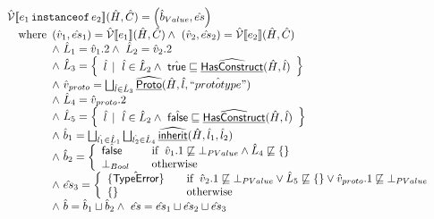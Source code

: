 \[
\begin{array}{ll}
\aV\lbr e_1\,\TT{instanceof}\,e_2\rbr (\hat{H},\hat{C})
 = \left(\hat{b}_{Value},\hat{es}\right)\\
\quad\wherec{
  (\hat{v}_1,\hat{es}_1) = \aV\lbr e_1\rbr(\hat{H},\hat{C})
  \land\ (\hat{v}_2,\hat{es}_2) = \aV\lbr e_2\rbr(\hat{H},\hat{C})\\
  \land\ \hat{L}_1 = \hat{v}_1.2
  \land\ \hat{L}_2 = \hat{v}_2.2\\
  \land\ \hat{L}_3 = \set{ \hat{l} \,\mid\ \hat{l}\in\hat{L}_2\land\ \atrue\sqsubseteq\ahf{HasConstruct}(\hat{H},\hat{l}) } \\
  \land\ \hat{v}_{proto} = \bigsqcup_{\hat{l}\in\hat{L}_3} \ahf{Proto}(\hat{H},\hat{l},\hat{``prototype"}) \\
  \land\ \hat{L}_4 = \hat{v}_{proto}.2 \\
  \land\ \hat{L}_5 = \set{ \hat{l} \,\mid\ \hat{l}\in\hat{L}_2\land\ \afalse\sqsubseteq\ahf{HasConstruct}(\hat{H},\hat{l}) } \\
  \land\ \hat{b}_1 = \bigsqcup_{\hat{l_1}\in\hat{L}_1}\bigsqcup_{\hat{l_2}\in\hat{L}_4}\ahf{inherit}(\hat{H},\hat{l}_1,\hat{l}_2) \\
  \land\ \hat{b}_2 = \left\{
    \begin{array}{ll}
      \afalse & \quad\ifc{\hat{v}_1.1\not\sqsubseteq \bot_{PValue} \land \hat{L}_4\not\sqsubseteq \{\}} \\
      \bot_{Bool} & \quad\owc \\
    \end{array}
  \right.\\
  \land\ \hat{es}_3 = \left\{
    \begin{array}{ll}
      \{\hat{\exc{TypeError}}\} & \quad\ifc{\hat{v}_2.1\not\sqsubseteq \bot_{PValue}\lor \hat{L}_5\not\sqsubseteq\{\}\lor\hat{v}_{proto}.1\not\sqsubseteq \bot_{PValue}} \\
      \{\} & \quad\owc \\
    \end{array}
  \right.\\
  \land\ \hat{b} = \hat{b}_1 \sqcup \hat{b}_2 \land\ \hat{es} = \hat{es}_1 \sqcup \hat{es}_2 \sqcup \hat{es}_3
}
\\\\


\end{array}\]
